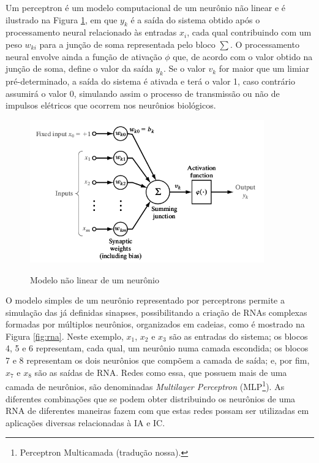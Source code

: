 Um perceptron é um modelo computacional de um neurônio não linear e é ilustrado na Figura \ref{fig:neuronmodel}, em que $y_k$ é a saída do sistema obtido após o processamento neural relacionado às entradas $x_i$, cada qual contribuindo com um peso $w_{ki}$ para a junção de soma representada pelo bloco $\sum$. O processamento neural envolve ainda a função de ativação $\phi$ que, de acordo com o valor obtido na junção de soma, define o valor da saída $y_k$. Se o valor $v_k$ for maior que um limiar pré-determinado, a saída do sistema é ativada e terá o valor 1, caso contrário assumirá o valor 0, simulando assim o processo de transmissão ou não de impulsos elétricos que ocorrem nos neurônios biológicos.

\begin{figure}[!htb]
    \centering
    \caption{Modelo não linear de um neurônio}
    \includegraphics[width=0.9\textwidth]{./04-figuras/neuron-diagram-gray}
    \label{fig:neuronmodel}
\end{figure}

O modelo simples de um neurônio representado por perceptrons permite a simulação das já definidas sinapses, possibilitando a criação de RNAs complexas formadas por múltiplos neurônios, organizados em cadeias, como é mostrado na Figura \ref{fig:rna}. Neste exemplo, $x_1$, $x_2$ e $x_3$ são as entradas do sistema; os blocos 4, 5 e 6 representam, cada qual, um neurônio numa camada escondida; os blocos 7 e 8 representam os dois neurônios que compõem a camada de saída; e, por fim, $x_7$ e $x_8$ são as saídas de RNA. Redes como essa, que possuem mais de uma camada de neurônios, são denominadas \textit{Multilayer Perceptron} (MLP\footnote{Perceptron Multicamada (tradução nossa).}). As diferentes combinações que se podem obter distribuindo os neurônios de uma RNA de diferentes maneiras fazem com que estas redes possam ser utilizadas em aplicações diversas relacionadas à IA e IC.



